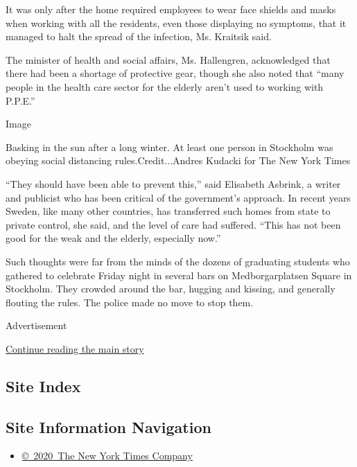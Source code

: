 It was only after the home required employees to wear face shields and
masks when working with all the residents, even those displaying no
symptoms, that it managed to halt the spread of the infection, Ms.
Kraitsik said.

The minister of health and social affairs, Ms. Hallengren, acknowledged
that there had been a shortage of protective gear, though she also noted
that ``many people in the health care sector for the elderly aren't used
to working with P.P.E.''

Image

Basking in the sun after a long winter. At least one person in Stockholm
was obeying social distancing rules.Credit...Andres Kudacki for The New
York Times

``They should have been able to prevent this,'' said Elisabeth Asbrink,
a writer and publicist who has been critical of the government's
approach. In recent years Sweden, like many other countries, has
transferred such homes from state to private control, she said, and the
level of care had suffered. ``This has not been good for the weak and
the elderly, especially now.''

Such thoughts were far from the minds of the dozens of graduating
students who gathered to celebrate Friday night in several bars on
Medborgarplatsen Square in Stockholm. They crowded around the bar,
hugging and kissing, and generally flouting the rules. The police made
no move to stop them.

Advertisement

\protect\hyperlink{after-bottom}{Continue reading the main story}

\hypertarget{site-index}{%
\subsection{Site Index}\label{site-index}}

\hypertarget{site-information-navigation}{%
\subsection{Site Information
Navigation}\label{site-information-navigation}}

\begin{itemize}
\tightlist
\item
  \href{https://help.nytimes3xbfgragh.onion/hc/en-us/articles/115014792127-Copyright-notice}{©~2020~The
  New York Times Company}
\end{itemize}


